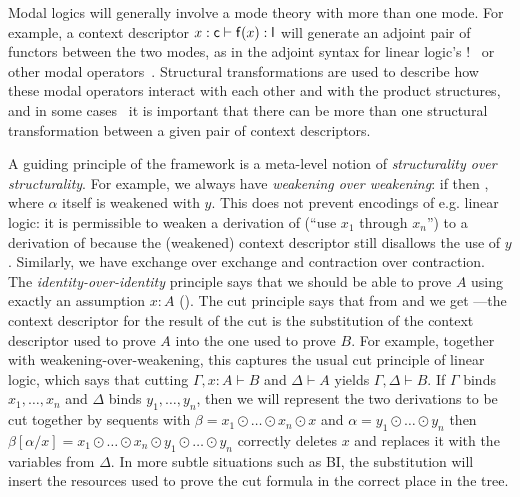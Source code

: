Modal logics will generally involve a mode theory with more than one
mode.  For example, a context descriptor $x : \mathsf{c} \vdash \mathsf{f}(x)
: \mathsf{l}$ will generate an adjoint pair of functors between the two
modes, as in the adjoint syntax for linear logic's
$!$~\citep{bentonwadler96adjoint} or other modal
operators~\citep{reed09adjoint}.  Structural transformations are used to
describe how these modal operators interact with each other and with the
product structures, and in some cases~\citep{ls16adjoint} it is
important that there can be more than one structural transformation
between a given pair of context descriptors.

A guiding principle of the framework is a meta-level notion of
\emph{structurality over structurality}.  For example, we always have
\emph{weakening over weakening}: if  then
, where $\alpha$ itself is weakened with $y$.
This does not prevent encodings of e.g. linear logic: it is permissible
to weaken a derivation of 
(``use $x_1$ through $x_n$'') to a derivation of  because the (weakened) context descriptor
still disallows the use of $y$.  Similarly, we have exchange over
exchange and contraction over contraction.  The \emph{identity-over-identity}
principle says that we should be able to prove $A$ using exactly an
assumption $x:A$ ({}).  The cut principle says
that from  and  we get
{}---the context descriptor for
the result of the cut is the substitution of the context descriptor used
to prove $A$ into the one used to prove $B$.  For example, together with
weakening-over-weakening, this captures the usual cut principle of
linear logic, which says that cutting $\Gamma,x:A \vdash B$ and $\Delta
\vdash A$ yields $\Gamma,\Delta \vdash B$.  If $\Gamma$ binds
$x_1,\ldots,x_n$ and $\Delta$ binds $y_1,\ldots,y_n$, then we will
represent the two derivations to be cut together by sequents with $\beta
= x_1 \odot \ldots \odot x_n \odot x$ and $\alpha = y_1 \odot \ldots
\odot y_n$ then $\beta[\alpha/x] = x_1 \odot \ldots \odot x_n \odot y_1
\odot \ldots \odot y_n$ correctly deletes $x$ and replaces it with the
variables from $\Delta$.  In more subtle situations such as BI, the
substitution will insert the resources used to prove the cut formula in
the correct place in the tree.

